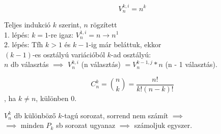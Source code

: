 \documentclass{beamer}
\begin{document}
\begin{frame}
\begin{tcolorbox}[title={Def.: Ismétléses Variáció}]
\end{tcolorbox}

\begin{tcolorbox}[title={Tétel: Ismétléses variációk száma}]
$$V_n^{k, i} = n^k$$
\end{tcolorbox}

\begin{tcolorbox}[title={Bizonyítás}]
Teljes indukció $k$ szerint, $n$ rögzített\\
1. lépés: $k = 1$-re igaz: $V_n^{1, i} = n \rightarrow n^1$\\
2. lépés: Tfh $k > 1$ és $k - 1$-ig már beláttuk, ekkor\\
$(k - 1)$-es osztályú variációból $k$-ad osztályú:\\
$n$ db választás $\implies$ $V_n^{k, i}$ (n választás) $= V_n^{k - 1, j} * n$ (n - 1 választás).
\end{tcolorbox}
\end{frame}

\begin{frame}
\begin{tcolorbox}[title={Def.: Ismétlés nélküli Kombináció}]
\end{tcolorbox}

\begin{tcolorbox}[title={Tétel: Kombinációk száma}]
$$C_n^k = {{n}\choose{k}} = \frac{n!}{k!(n - k)!} $$, ha $k \neq n$, különben 0.
\end{tcolorbox}

\begin{tcolorbox}[title={Bizonyítás}]
$V_n^k$ db különböző $k$-tagú sorozat, sorrend nem számít $\implies$\\
$\implies$ minden $P_k$ sb sorozat ugyanaz $\implies$ számoljuk egyszer.\\
\end{tcolorbox}
\end{frame}
\end{document}
